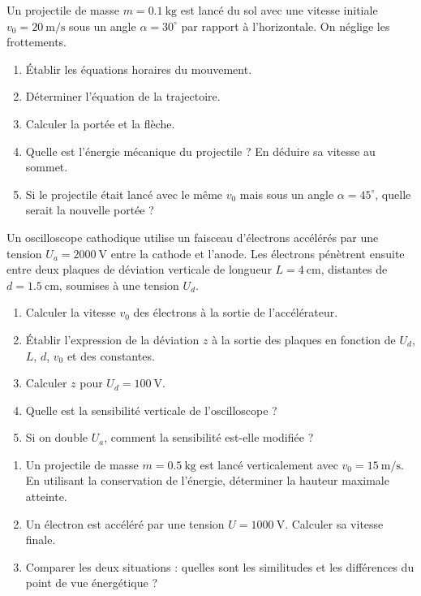Un projectile de masse $m=\SI{0.1}{\kilogram}$ est lancé du sol avec une vitesse initiale $v_0=\SI{20}{\metre\per\second}$ sous un angle $\alpha=30^\circ$ par rapport à l’horizontale. On néglige les frottements.
\begin{enumerate}
\item Établir les équations horaires du mouvement.
\item Déterminer l’équation de la trajectoire.
\item Calculer la portée et la flèche.
\item Quelle est l’énergie mécanique du projectile ? En déduire sa vitesse au sommet.
\item Si le projectile était lancé avec le même $v_0$ mais sous un angle $\alpha=45^\circ$, quelle serait la nouvelle portée ?
\end{enumerate}

Un oscilloscope cathodique utilise un faisceau d’électrons accélérés par une tension $U_a=\SI{2000}{\volt}$ entre la cathode et l’anode. Les électrons pénètrent ensuite entre deux plaques de déviation verticale de longueur $L=\SI{4}{\centi\metre}$, distantes de $d=\SI{1.5}{\centi\metre}$, soumises à une tension $U_d$.
\begin{enumerate}
\item Calculer la vitesse $v_0$ des électrons à la sortie de l’accélérateur.
\item Établir l’expression de la déviation $z$ à la sortie des plaques en fonction de $U_d$, $L$, $d$, $v_0$ et des constantes.
\item Calculer $z$ pour $U_d=\SI{100}{\volt}$.
\item Quelle est la sensibilité verticale de l’oscilloscope ?
\item Si on double $U_a$, comment la sensibilité est-elle modifiée ?
\end{enumerate}

\begin{enumerate}
\item Un projectile de masse $m=\SI{0.5}{\kilogram}$ est lancé verticalement avec $v_0=\SI{15}{\metre\per\second}$. En utilisant la conservation de l’énergie, déterminer la hauteur maximale atteinte.
\item Un électron est accéléré par une tension $U=\SI{1000}{\volt}$. Calculer sa vitesse finale.
\item Comparer les deux situations : quelles sont les similitudes et les différences du point de vue énergétique ?
\end{enumerate}

